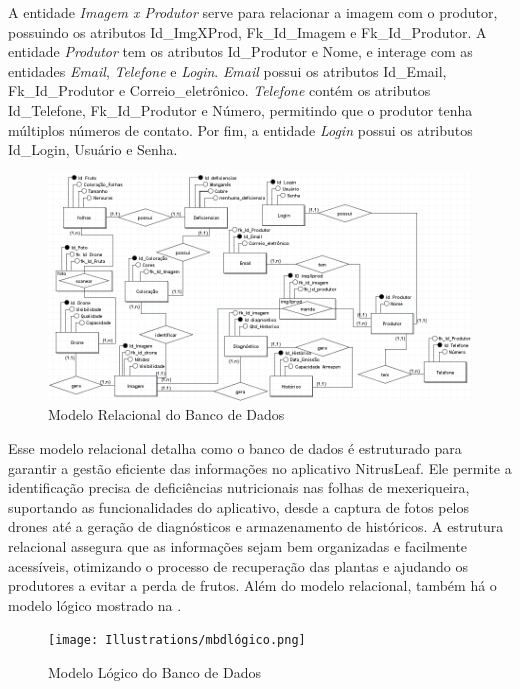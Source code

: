 A entidade \textit{Imagem x Produtor} serve para relacionar a imagem com o produtor, possuindo os atributos Id\_ImgXProd, Fk\_Id\_Imagem e Fk\_Id\_Produtor. A entidade \textit{Produtor} tem os atributos Id\_Produtor e Nome, e interage com as entidades \textit{Email}, \textit{Telefone} e \textit{Login}. \textit{Email} possui os atributos Id\_Email, Fk\_Id\_Produtor e Correio\_eletrônico. \textit{Telefone} contém os atributos Id\_Telefone, Fk\_Id\_Produtor e Número, permitindo que o produtor tenha múltiplos números de contato. Por fim, a entidade \textit{Login} possui os atributos Id\_Login, Usuário e Senha.

\begin{figure}[H]
    \centering
    \caption{Modelo Relacional do Banco de Dados}%
    \label{fig:mbdrelacional}
    \includegraphics[width=0.8\linewidth]{Illustrations/mbdrelacional.png}
    \end{figure}

Esse modelo relacional detalha como o banco de dados é estruturado para garantir a gestão eficiente das informações no aplicativo NitrusLeaf. Ele permite a identificação precisa de deficiências nutricionais nas folhas de mexeriqueira, suportando as funcionalidades do aplicativo, desde a captura de fotos pelos drones até a geração de diagnósticos e armazenamento de históricos. A estrutura relacional assegura que as informações sejam bem organizadas e facilmente acessíveis, otimizando o processo de recuperação das plantas e ajudando os produtores a evitar a perda de frutos. Além do modelo relacional, também há o modelo lógico mostrado na .

\begin{figure}[H]
\centering
\caption{Modelo Lógico do Banco de Dados}%
\label{fig:mbdlogico}
\texttt{[image: Illustrations/mbdlógico.png]}
\end{figure}

